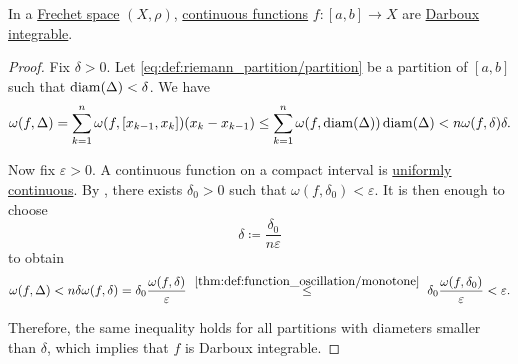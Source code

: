 \begin{proposition}\label{thm:countinuous_functions_integrable}
  In a \hyperref[def:frechet_space]{Frechet space} \( (X, \rho) \), \hyperref[def:global_continuity]{continuous functions} \( f: [a, b] \to X \) are \hyperref[def:darboux_integrability]{Darboux integrable}.
\end{proposition}
\begin{proof}
  Fix \( \delta > 0 \). Let \eqref{eq:def:riemann_partition/partition} be a partition of \( [a, b] \) such that \( \operatorname{diam}(\Delta) < \delta \). We have
  \begin{equation*}
    \omega(f, \Delta)
    =
    \sum_{k=1}^n \omega(f, [x_{k-1}, x_k]) (x_k - x_{k-1})
    \leq
    \sum_{k=1}^n \omega(f, \operatorname{diam}(\Delta)) \operatorname{diam}(\Delta)
    <
    n \omega(f, \delta) \delta.
  \end{equation*}

  Now fix \( \varepsilon > 0 \). A continuous function on a compact interval is \hyperref[def:uniform_continuity]{uniformly continuous}. By , there exists \( \delta_0 > 0 \) such that \( \omega(f, \delta_0) < \varepsilon \). It is then enough to choose
  \begin{equation*}
    \delta \coloneqq \frac {\delta_0} {n \varepsilon}
  \end{equation*}
  to obtain
  \begin{equation*}
    \omega(f, \Delta)
    <
    n \delta \omega(f, \delta)
    =
    \delta_0 \frac {\omega(f, \delta)} {\varepsilon}
    \reloset {\ref{thm:def:function_oscillation/monotone}} \leq
    \delta_0 \frac {\omega(f, \delta_0)} {\varepsilon}
    <
    \varepsilon.
  \end{equation*}

  Therefore, the same inequality holds for all partitions with diameters smaller than \( \delta \), which implies that \( f \) is Darboux integrable.
\end{proof}

